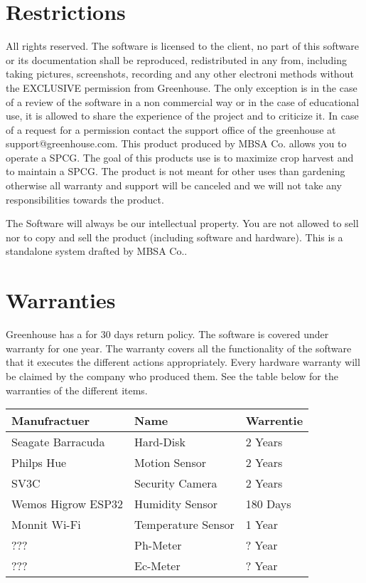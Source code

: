 \section{Restrictions}
All rights reserved. The software is licensed to the client, no part of this
software or its documentation shall be reproduced, redistributed in any from,
including taking pictures, screenshots, recording and any other electroni
methods  without the EXCLUSIVE permission from Greenhouse. The only exception is
in the case of a review of the software in a non commercial way or in the case
of educational use, it is allowed to share the experience of the project and to
criticize it.  In case of a request for a permission contact the support office
of the greenhouse at support@greenhouse.com. This product produced by MBSA Co.
allows you to operate a SPCG. The goal of this products use is to maximize crop harvest and to maintain a SPCG. The product is not meant for other uses than gardening otherwise all warranty and support will be canceled and we will not take any responsibilities towards the product.

The Software will always be our intellectual property. You are not allowed to
sell nor to copy and sell the product (including software and hardware). This is
a standalone system drafted by MBSA Co..

\section{Warranties}
Greenhouse has a for 30 days return policy. The software is covered under
warranty for one year. The warranty covers all the functionality of the software
that it executes the different actions appropriately.
Every hardware warranty will be claimed by the company who produced them.  See
the table below for the warranties of the different items.

\begin{table}
\begin{center}
\label{tab:Warrenties}
\begin{tabular}{| m{4cm} | m{4cm} | m{4cm} |}
\hline
\textbf{Manufractuer} & \textbf{Name} & \textbf{Warrentie} \\ \hline 
Seagate Barracuda & Hard-Disk & 2 Years \\ \hline 
Philps Hue & Motion Sensor & 2 Years \\ \hline 
SV3C & Security Camera & 2 Years \\ \hline 
Wemos Higrow ESP32 & Humidity Sensor & 180 Days \\ \hline
Monnit Wi-Fi & Temperature Sensor & 1 Year \\ \hline
??? & Ph-Meter & ? Year \\ \hline
??? & Ec-Meter & ? Year \\ 
\hline 
\end{tabular}
\end{center}
\end{table}
\hfill\break

